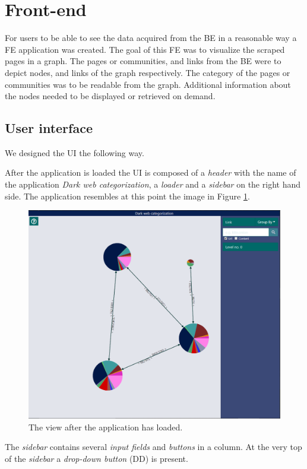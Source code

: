 \section{Front-end}
For users to be able to see the data acquired from the BE in a reasonable way a FE application was created. The goal of this FE was to visualize the scraped pages in a graph. The pages or communities, and links from the BE were to depict nodes, and links of the graph respectively. The category of the pages or communities was to be readable from the graph. Additional information about the nodes needed to be displayed or retrieved on demand.

\subsection{User interface}
We designed the UI the following way. 

After the application is loaded the UI is composed of a \textit{header} with the name of the application \textit{Dark web categorization}, a \textit{loader} and a \textit{sidebar} on the right hand side. The application resembles at this point the image in Figure \ref{zeroLevelGraphBasic}.
\begin{figure}[ht!]
  \centering
  \includegraphics[width=\textwidth]{Images/basic_view.png}
  \caption{The view after the application has loaded.}
  \label{zeroLevelGraphBasic}
\end{figure} 

The \textit{sidebar} contains several \textit{input fields} and \textit{buttons} in a column. At the very top of the \textit{sidebar} a \textit{drop-down button} (DD) is present. 

